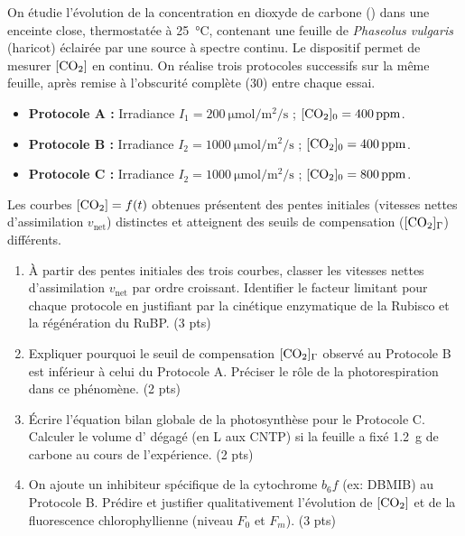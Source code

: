\documentclass[11pt]{article}
\begin{document}
\begin{exercice}
On étudie l'évolution de la concentration en dioxyde de carbone () dans une enceinte close, thermostatée à \qty{25}{\celsius}, contenant une feuille de \textit{Phaseolus vulgaris} (haricot) éclairée par une source à spectre continu. Le dispositif permet de mesurer $[\ce{CO2}]$ en continu. On réalise trois protocoles successifs sur la même feuille, après remise à l'obscurité complète (\qty{30}{\min}) entre chaque essai.

\begin{itemize}
    \item \textbf{Protocole A :} Irradiance $I_1 = \qty{200}{\micro\mole\per\square\metre\per\second}$ ; $[\ce{CO2}]_0 = \qty{400}{ppm}$.
    \item \textbf{Protocole B :} Irradiance $I_2 = \qty{1000}{\micro\mole\per\square\metre\per\second}$ ; $[\ce{CO2}]_0 = \qty{400}{ppm}$.
    \item \textbf{Protocole C :} Irradiance $I_2 = \qty{1000}{\micro\mole\per\square\metre\per\second}$ ; $[\ce{CO2}]_0 = \qty{800}{ppm}$.
\end{itemize}
Les courbes $[\ce{CO2}] = f(t)$ obtenues présentent des pentes initiales (vitesses nettes d'assimilation $v_{\text{net}}$) distinctes et atteignent des seuils de compensation ($[\ce{CO2}]_{\Gamma}$) différents.

\begin{enumerate}
    \item À partir des pentes initiales des trois courbes, classer les vitesses nettes d'assimilation $v_{\text{net}}$ par ordre croissant. Identifier le facteur limitant pour chaque protocole en justifiant par la cinétique enzymatique de la Rubisco et la régénération du RuBP. (3 pts)
    \item Expliquer pourquoi le seuil de compensation $[\ce{CO2}]_{\Gamma}$ observé au Protocole B est inférieur à celui du Protocole A. Préciser le rôle de la photorespiration dans ce phénomène. (2 pts)
    \item Écrire l'équation bilan globale de la photosynthèse pour le Protocole C. Calculer le volume d' dégagé (en \unit{\liter} aux CNTP) si la feuille a fixé \qty{1,2}{\gram} de carbone au cours de l'expérience. (2 pts)
    \item On ajoute un inhibiteur spécifique de la cytochrome $b_6f$ (ex: DBMIB) au Protocole B. Prédire et justifier qualitativement l'évolution de $[\ce{CO2}]$ et de la fluorescence chlorophyllienne (niveau $F_0$ et $F_m$). (3 pts)
\end{enumerate}
\end{exercice}
\end{document}
